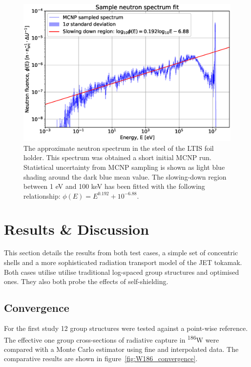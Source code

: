 \begin{figure}[H]
  \centering
  \includegraphics[width=\linewidth]{spectrum}
  \caption{The approximate neutron spectrum in the steel of the LTIS foil holder. This spectrum was obtained a short initial MCNP run. Statistical uncertainty from MCNP sampling is shown as light blue shading around the dark blue mean value. The slowing-down region between 1 eV and 100 keV has been fitted with the following relationship: $\phi(E) = E^{0.192} + 10^{-6.88}$.}
  \label{fig:opt_spectrum}
\end{figure}

\section{Results \& Discussion}
\label{sec:results}
This section details the results from both test cases, a simple set of concentric shells and a more sophisticated radiation transport model of the JET tokamak. Both cases utilise utilise traditional log-spaced group structures and optimised ones. They also both probe the effects of self-shielding.

\subsection{Convergence}
For the first study 12 group structures were tested against a point-wise reference. The effective one group cross-sections of radiative capture in \textsuperscript{186}W were compared with a Monte Carlo estimator using fine and interpolated data. The comparative results are shown in figure~\ref{fig:W186_convergence}. 
 
